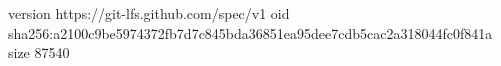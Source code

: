 version https://git-lfs.github.com/spec/v1
oid sha256:a2100c9be5974372fb7d7c845bda36851ea95dee7cdb5cac2a318044fc0f841a
size 87540
